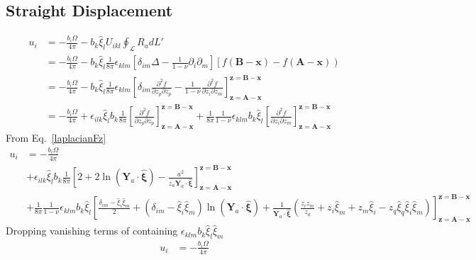 \documentclass[10pt]{report}
\begin{document}
{%

\subsection{Straight Displacement}
\begin{align}
 u_i
 &=-\frac{ b_i\Omega}{4\pi}-b_k\hat{\xi}_lU_{ikl}\oint_\mathcal{L}R_adL'\nonumber\\
 &=-\frac{ b_i\Omega}{4\pi}-b_k\hat{\xi}_l\frac{1}{8\pi}\epsilon_{klm}\left[ \delta_{im}\Delta  -\frac{1}{1-\nu} \partial_i\partial_m  \right]\left[f(\bm B-\bm x)-f(\bm A-\bm x)\right)\nonumber\\
 &=-\frac{ b_i\Omega}{4\pi}-b_k\hat{\xi}_l\frac{1}{8\pi}\epsilon_{klm}\left[ \delta_{im}\frac{\partial^2f}{\partial z_p\partial z_p}  -\frac{1}{1-\nu} \frac{\partial^2 f}{\partial z_i\partial z_m}  \right]^{\bm z=\bm B-\bm x}_{\bm z=\bm A-\bm x}\nonumber\\
 &=-\frac{ b_i\Omega}{4\pi}+\epsilon_{ilk}\hat{\xi}_lb_k\frac{1}{8\pi}\left[ \frac{\partial^2f}{\partial z_p\partial z_p}\right]^{\bm z=\bm B-\bm x}_{\bm z=\bm A-\bm x}  +\frac{1}{8\pi}\frac{1}{1-\nu} \epsilon_{klm}b_k\hat{\xi}_l\left[\frac{\partial^2 f}{\partial z_i\partial z_m}  \right]^{\bm z=\bm B-\bm x}_{\bm z=\bm A-\bm x}
\end{align}
From Eq.~\eqref{laplacianFz}
\begin{align}
 u_i &=-\frac{ b_i\Omega}{4\pi}\nonumber\\
 &+\epsilon_{ilk}\hat{\xi}_lb_k\frac{1}{8\pi}\left[2+ 2\ln\left(\bm Y_a \cdot \hat{\bm \xi}\right)-\frac{a^2}{z_a \bm Y_a \cdot \hat{\bm \xi}}\right]^{\bm z=\bm B-\bm x}_{\bm z=\bm A-\bm x}  \nonumber\\
 &+\frac{1}{8\pi}\frac{1}{1-\nu} \epsilon_{klm}b_k\hat{\xi}_l\left[\frac{ \delta_{im}-\hat{\xi}_i\hat{\xi}_m}{2}
+ (\delta_{im}-\hat{\xi}_i\hat{\xi}_m)\ln\left(\bm Y_a \cdot \hat{\bm \xi}\right)
+ \frac{1}{ \bm Y_a \cdot \hat{\bm \xi}}\left(\frac{z_iz_m}{z_a}+z_i\hat{\xi}_m+z_m\hat{\xi}_i-z_q\hat{\xi}_q\hat{\xi}_i\hat{\xi}_m\right) \right]^{\bm z=\bm B-\bm x}_{\bm z=\bm A-\bm x}
\end{align}
Dropping vanishing terms of containing $\epsilon_{klm}b_k\hat{\xi}_l\hat{\xi}_m$
\begin{align}
 u_i &=-\frac{ b_i\Omega}{4\pi}\nonumber\\

\end{align}}
\end{document}
